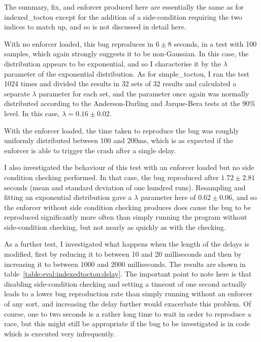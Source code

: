 The summary, fix, and enforcer produced here are essentially the same
as for indexed\_toctou except for the addition of a side-condition
requiring the two indices to match up, and so is not discussed in
detail here.

With no enforcer loaded, this bug reproduces in $6 \pm 8$ seconds, in
a test with 100 samples, which again strongly suggests it to be
non-Gaussian.  In this case, the distribution appears to be
exponential, and so I characterise it by the $\lambda$ parameter of
the exponential distribution.  As for simple\_toctou, I ran the test
1024 times and divided the results in 32 sets of 32 results and
calculated a separate $\lambda$ parameter for each set, and the
parameter once again was normally distributed according to the
Anderson-Darling and Jarque-Bera tests at the 90\% level.  In this
case, $\lambda = 0.16 \pm 0.02$.

  


With the enforcer loaded, the time taken to reproduce the bug was
roughly uniformly distributed between 100 and 200ms, which is as
expected if the enforcer is able to trigger the crash after a single
delay. 

I also investigated the behaviour of this test with an enforcer loaded
but no side condition checking performed.  In that case, the bug
reproduced after $1.72 \pm 2.81$ seconds (mean and standard deviation
of one hundred runs).  Resampling and fitting an exponential
distribution gave a $\lambda$ parameter here of $0.62 \pm 0.06$, and
so the enforcer without side condition checking produces does cause
the bug to be reproduced significantly more often than simply running
the program without side-condition checking, but not nearly as quickly
as with the checking.

As a further test, I investigated what happens when the length of the
delays is modified, first by reducing it to between 10 and 20
milliseconds and then by increasing it to between 1000 and 2000
milliseconds.  The results are shown in
table~\ref{table:eval:indexedtoctou:delay}.  The important point to
note here is that disabling side-condition checking and setting a
timeout of one second actually leads to a lower bug reproduction rate
than simply running without an enforcer of any sort, and increasing
the delay further would exacerbate this problem.  Of course, one to
two seconds is a rather long time to wait in order to reproduce a
race, but this might still be appropriate if the bug to be
investigated is in code which is executed very infrequently.

